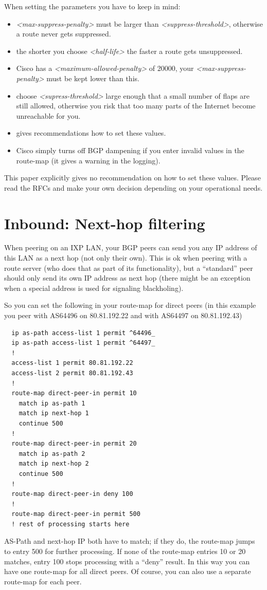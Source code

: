When setting the parameters you have to keep in mind:
\begin{itemize}
  \item \emph{<max-suppress-penalty>} must be larger than \emph{<suppress-threshold>}, otherwise a route never gets suppressed.
  \item the shorter you choose \emph{<half-life>} the faster a route gets unsuppressed.
  \item Cisco has a \emph{<maximum-allowed-penalty>} of 20000, your \emph{<max-suppress-penalty>} must be kept lower than this.
  \item choose \emph{<supress-threshold>} large enough that a small number of  flaps are still allowed, otherwise you risk that too many parts of the Internet become unreachable for you.
  \item {} gives recommendations how to set these values.
  \item Cisco simply turns off BGP dampening if you enter invalid values in the route-map (it gives a warning in the logging).
\end{itemize}

This paper explicitly gives no recommendation on how to set these values. Please read the RFCs and make your own decision depending on your operational needs.

\section{Inbound: Next-hop filtering}
When peering on an IXP LAN, your BGP peers can send you any IP address of this LAN as a next hop (not only their own). This is ok when peering with a route server (who does that as part of its functionality), but a ``standard'' peer should only send its own IP address as next hop (there might be an exception when a special address is used for signaling \gls{blackholing}).

So you can set the following in your route-map for direct peers (in this example you peer with AS64496 on 80.81.192.22 and with AS64497 on 80.81.192.43)
\begin{verbatim}
  ip as-path access-list 1 permit ^64496_
  ip as-path access-list 1 permit ^64497_
  !
  access-list 1 permit 80.81.192.22
  access-list 2 permit 80.81.192.43
  !
  route-map direct-peer-in permit 10
    match ip as-path 1
    match ip next-hop 1
    continue 500
  !
  route-map direct-peer-in permit 20
    match ip as-path 2
    match ip next-hop 2
    continue 500
  !
  route-map direct-peer-in deny 100
  !
  route-map direct-peer-in permit 500
  ! rest of processing starts here
\end{verbatim}
AS-Path and next-hop IP both have to match; if they do, the route-map jumps to entry 500 for further processing. If none of the route-map entries 10 or 20 matches, entry 100 stops processing with a ``deny'' result.  In this way you can have one route-map for all direct peers. Of course, you can also use a separate route-map for each peer.


